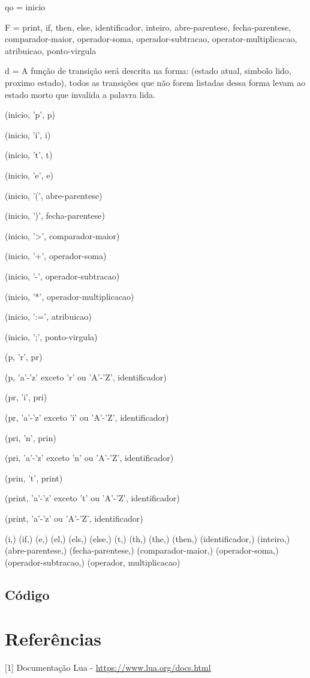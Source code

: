 \documentclass[12pt,a4paper,twoside]{report}
\begin{document}
qo = inicio

F = {print, if, then, else, identificador, inteiro, abre-parentese, fecha-parentese, comparador-maior, operador-soma, operador-subtracao, operator-multiplicacao, atribuicao, ponto-virgula}

d =
A função de transição será descrita na forma:
(estado atual, simbolo lido, proximo estado), todos as transições que não forem listadas dessa forma levam ao estado morto que invalida a palavra lida.

(inicio, 'p', p)

(inicio, 'i', i)

(inicio, 't', t)

(inicio, 'e', e)

(inicio, '(', abre-parentese)

(inicio, ')', fecha-parentese)

(inicio, '>', comparador-maior)

(inicio, '+', operador-soma)

(inicio, '-', operador-subtracao)

(inicio, '*', operador-multiplicacao)

(inicio, ':=', atribuicao)

(inicio, ';', ponto-virgula)

(p, 'r', pr)

(p, 'a'-'z' exceto 'r' ou 'A'-'Z', identificador)

(pr, 'i', pri)

(pr, 'a'-'z' exceto 'i' ou 'A'-'Z', identificador)

(pri, 'n', prin)

(pri, 'a'-'z' exceto 'n' ou 'A'-'Z', identificador)

(prin, 't', print)

(print, 'a'-'z' exceto 't' ou 'A'-'Z', identificador)

(print, 'a'-'z' ou 'A'-'Z', identificador)

(i,)
(if,)
(e,)
(el,)
(els,)
(else,)
(t,)
(th,)
(the,)
(then,)
(identificador,)
(inteiro,)
(abre-parentese,)
(fecha-parentese,)
(comparador-maior,)
(operador-soma,)
(operador-subtracao,)
(operador, multiplicacao)
\section{Código}

\chapter{Referências}
[1] Documentação Lua - \url{https://www.lua.org/docs.html}
\end{document}
